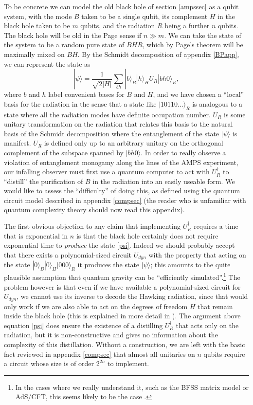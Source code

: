 \documentclass[12pt]{article}
\newcommand{\be}{\begin{equation}}
\newcommand{\ee}{\end{equation}}
\newcommand{\ran}{\rangle}
\begin{document}
To be concrete we can model the old black hole of section \ref{ampssec} as a qubit system, with the mode $B$ taken to be a single qubit, its complement $H$ in the black hole taken to be $m$ qubits, and the radiation $R$ being a further $n$ qubits.  The black hole will be old in the Page sense if $n\gg m$.  We can take the state of the system to be a random pure state of $BHR$, which by Page's theorem will be maximally mixed on $BH$.  By the Schmidt decomposition of appendix \ref{BPapp}, we can represent the state as 
\be\label{psi}
|\psi\ran=\frac{1}{\sqrt{2|H|}}\sum_{bh}|b\ran_B |h\ran_H U_R |bh0\ran_R,
\ee
where $b$ and $h$ label convenient bases for $B$ and $H$, and we have chosen a ``local'' basis for the radiation in the sense that a state like $|10110\ldots \ran_R$ is analogous to a state where all the radiation modes have definite occupation number.  $U_R$ is some unitary transformation on the radiation that relates this basis to the natural basis of the Schmidt decomposition where the entanglement of the state $|\psi\ran$ is manifest.  $U_R$ is defined only up to an arbitrary unitary on the orthogonal complement of the subspace spanned by $|bh0\ran$.  In order to really observe a violation of entanglement monogamy along the lines of the AMPS experiment, our infalling observer must first use a quantum computer to act with $U_R^\dagger$ to ``distill'' the purification of $B$ in the radiation into an easily useable form.  We would like to assess the ``difficulty'' of doing this, as defined using the quantum circuit model described in appendix \ref{compsec} (the reader who is unfamiliar with quantum complexity theory should now read this appendix).  

The first obvious objection to any claim that implementing $U_R^\dagger$ requires a time that is exponential in $n$ is that the black hole certainly does not require exponential time to \textit{produce} the state \eqref{psi}.  Indeed we should probably accept that there exists a polynomial-sized circuit $U_{dyn}$ with the property that acting on the state $|0\ran_B|0\ran_H |000\ran_R$ it produces the state $|\psi\ran$; this amounts to the quite plausible assumption that quantum gravity can be ``efficiently simulated''.\footnote{In the cases where we really understand it, such as the BFSS matrix model or AdS/CFT, this seems likely to be the case \cite{feynman1982simulating,lloyd1996universal,Jordan:2011ne}.}   The problem however is that even if we have available a polynomial-sized circuit for $U_{dyn}$, we cannot use its inverse to decode the Hawking radiation, since that would only work if we are also able to act on the degrees of freedom $H$ that remain inside the black hole (this is explained in more detail in \cite{Harlow:2013tf}).  The argument above equation \eqref{psi} does ensure the existence of a distilling $U_R^\dagger$ that acts only on the radiation, but it is non-constructive and gives no information about the complexity of this distillation.  Without a construction, we are left with the basic fact reviewed in appendix \ref{compsec} that almost all unitaries on $n$ qubits require a circuit whose size is of order $2^{2n}$ to implement.
\end{document}
